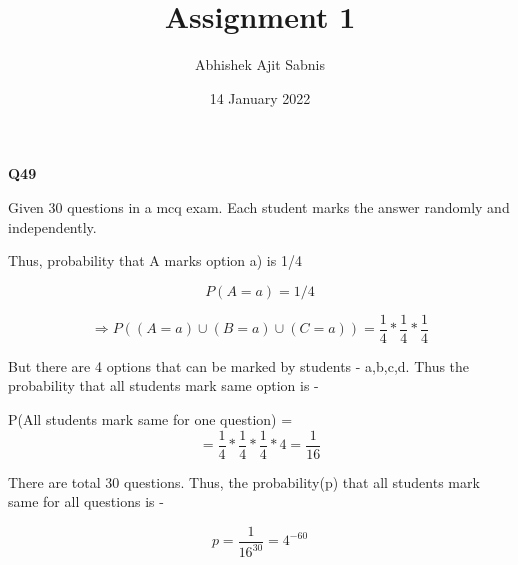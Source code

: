 \documentclass{article}
\title{\textbf{Assignment 1}}
\author{Abhishek Ajit Sabnis}
\date{14 January 2022}
\begin{document}
\maketitle
\begin{center}
{\textbf{\Large Q49 }}
\end{center}

Given 30 questions in a mcq exam. Each student marks the answer randomly and independently. 


Thus, probability that A marks option a) is 1/4

\begin{equation}
    P(A=a) = 1/4
\end{equation}

\begin{equation}
    \Rightarrow P((A=a) \cup (B=a) \cup (C=a)) = \frac{1}{4} * \frac{1}{4} * \frac{1}{4}
\end{equation}

But there are 4 options that can be marked by students - a,b,c,d. Thus the probability that all students mark same option is - 
\vspace{0.5cm}

P(All students mark same for one question) = 
\begin{equation}
     = \frac{1}{4} * \frac{1}{4} * \frac{1}{4} *4 = \frac{1}{16}
\end{equation}

There are total 30 questions. Thus, the probability(p) that all students mark same for all questions is - 

\begin{equation}
     p = \frac{1}{16^{30}} = 4^{-60}
\end{equation}
\end{document}
